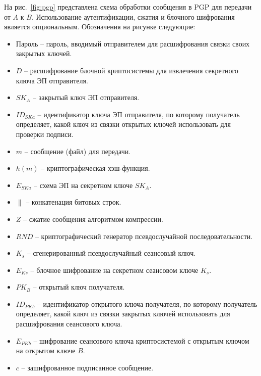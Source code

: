 На рис.~\ref{fig:pgp} представлена схема обработки сообщения в PGP для передачи от $A$ к $B$. Использование аутентификации, сжатия и блочного шифрования является опциональным. Обозначения на рисунке следующие:
\begin{itemize}
    \item Пароль -- пароль, вводимый отправителем для расшифрования связки своих закрытых ключей.
    \item $D$ -- расшифрование блочной криптосистемы для извлечения секретного ключа ЭП отправителя.
    \item $SK_A$ -- закрытый ключ ЭП отправителя.
    \item $ID_{SKa}$ -- идентификатор ключа ЭП отправителя, по которому получатель определяет, какой ключ из связки открытых ключей использовать для проверки подписи.
    \item $m$ -- сообщение (файл) для передачи.
    \item $h(m)$ -- криптографическая хэш-функция.
    \item $E_{SKa}$ -- схема ЭП на секретном ключе $SK_A$.
    \item $\|$ -- конкатенация битовых строк.
    \item $Z$ -- сжатие сообщения алгоритмом компрессии.
    \item $RND$ -- криптографический генератор псевдослучайной последовательности.
    \item $K_s$ -- сгенерированный псевдослучайный сеансовый ключ.
    \item $E_{Ks}$ -- блочное шифрование на секретном сеансовом ключе $K_s$.
    \item $PK_B$ -- открытый ключ получателя.
    \item $ID_{PKb}$ -- идентификатор открытого ключа получателя, по которому получатель определяет, какой ключ из связки закрытых ключей использовать для расшифрования сеансового ключа.
    \item $E_{PKb}$ -- шифрование сеансового ключа криптосистемой с открытым ключом на открытом ключе $B$.
    \item $c$ -- зашифрованное подписанное сообщение.
\end{itemize}
